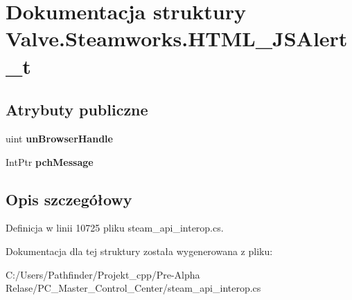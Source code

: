 \hypertarget{struct_valve_1_1_steamworks_1_1_h_t_m_l___j_s_alert__t}{}\section{Dokumentacja struktury Valve.\+Steamworks.\+H\+T\+M\+L\+\_\+\+J\+S\+Alert\+\_\+t}
\label{struct_valve_1_1_steamworks_1_1_h_t_m_l___j_s_alert__t}
\subsection*{Atrybuty publiczne}
\begin{DoxyCompactItemize}
\item 
\mbox{\label{struct_valve_1_1_steamworks_1_1_h_t_m_l___j_s_alert__t_ad4aea51fedc67f363edb1bbad091a0a3}} 
uint {\bfseries un\+Browser\+Handle}
\item 
\mbox{\label{struct_valve_1_1_steamworks_1_1_h_t_m_l___j_s_alert__t_ae1781f75d744b656970b6eaaa6bdaa48}} 
Int\+Ptr {\bfseries pch\+Message}
\end{DoxyCompactItemize}


\subsection{Opis szczegółowy}


Definicja w linii 10725 pliku steam\+\_\+api\+\_\+interop.\+cs.



Dokumentacja dla tej struktury została wygenerowana z pliku\+:\begin{DoxyCompactItemize}
\item 
C\+:/\+Users/\+Pathfinder/\+Projekt\+\_\+cpp/\+Pre-\/\+Alpha Relase/\+P\+C\+\_\+\+Master\+\_\+\+Control\+\_\+\+Center/steam\+\_\+api\+\_\+interop.\+cs\end{DoxyCompactItemize}
